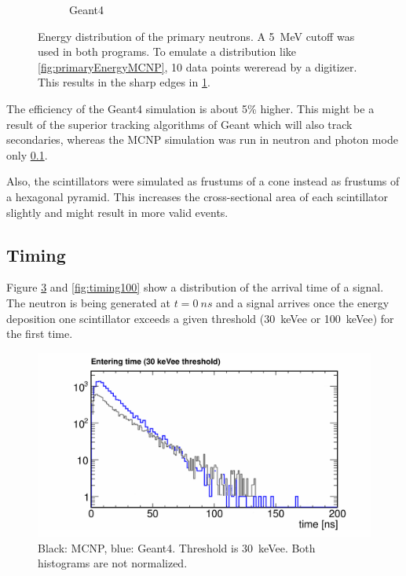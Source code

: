 \documentclass[12pt]{article}
\begin{document}
\begin{figure}[htbp]
\begin{subfigure}[t]{0.55\textwidth}
  		\caption{Geant4}
  		\label{fig:primaryEnergyGeant4}
  	\end{subfigure}
  	\caption{Energy distribution of the primary neutrons. A \SI{5}{MeV} cutoff was used in both programs. To emulate a distribution like  \ref{fig:primaryEnergyMCNP}, 10 data points were\gvertneqq read by a digitizer. This results in the sharp edges in \ref{fig:primaryEnergyGeant4}.}
  	\label{fig_primaryEnergies}
  \end{figure}
  
 The efficiency of the Geant4 simulation is about 5\% higher. This might be a result of the superior tracking algorithms of Geant which will also track secondaries, whereas the MCNP simulation was run in neutron and photon mode only \ref{}. 
 
 Also, the scintillators were simulated as frustums of a cone instead as frustums of a hexagonal pyramid. This increases the cross-sectional area of each scintillator slightly and might result in more valid events.   
 
\subsection{Timing}

Figure \ref{fig:timing30} and \ref{fig:timing100} show a distribution of the arrival time of a signal. The neutron is being generated at $t=\SI{0}{ns}$ and a signal arrives once the energy deposition one scintillator exceeds a given threshold (\SI{30}{keVee} or \SI{100}{keVee}) for the first time.
 \begin{figure}[H]
 	     \includegraphics[trim = 0cm 0cm 0cm 1.1cm, clip, width=\textwidth]{pics/timing.pdf}
 	\caption{Black: MCNP, blue: Geant4. Threshold is \SI{30}{keVee}. Both histograms are not normalized.}
 	\label{fig:timing30}
 \end{figure}
\end{document}
